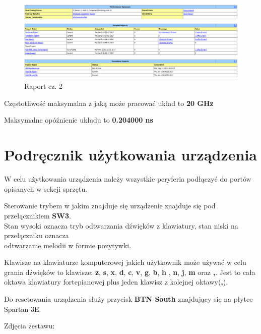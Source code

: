 \documentclass[a4paper]{report}
\begin{document}
	\newpage
	
	\begin{figure}[h!]
				\centering
				\includegraphics[width=1.0\textwidth]{report2.png}
				\caption{Raport cz. 2}
	\end{figure}	
	
	Częstotliwość maksymalna z jaką może pracować układ to 
	\textbf{\~20 GHz}
	 
	Maksymalne opóźnienie układu to
	\textbf{0.204000 ns}
	
	
		
	\section{Podręcznik użytkowania urządzenia}
	\par W celu użytkowania urządzenia należy wszystkie peryferia podłączyć do portów opisanych w sekcji sprzętu.
	
	\par Sterowanie trybem w jakim znajduje się urządzenie znajduje się pod przełącznikiem \textbf{SW3}. \\Stan wysoki
	oznacza tryb odtwarzania dźwięków z klawiatury, stan niski na przełączniku oznacza \\odtwarzanie melodii w formie
	pozytywki.
	\par Klawisze na klawiaturze komputerowej jakich użytkownik może używać w celu grania dźwięków to klawisze:
	\textbf{z}, \textbf{s}, \textbf{x}, \textbf{d}, \textbf{c}, \textbf{v}, \textbf{g}, \textbf{b}, \textbf{h}
	, \textbf{n}, \textbf{j}, \textbf{m} oraz \textbf{,}. Jest to cała oktawa klawiatury fortepianowej plus jeden
	klawisz z kolejnej oktawy(\textbf{,}).
	
	\par Do resetowania urządzenia służy przycisk \textbf{BTN South} znajdujący się na płytce Spartan-3E.
	
	Zdjęcia zestawu:\\
	
\end{document}
